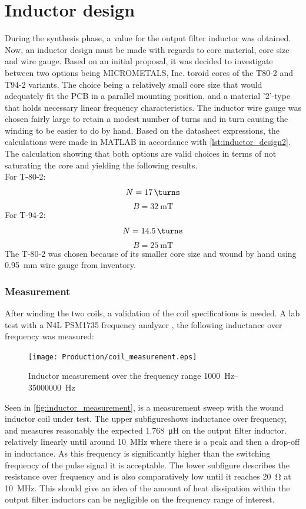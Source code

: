 \section{Inductor design}
During the synthesis phase, a value for the output filter inductor was obtained. Now, an inductor design must be made with regards to core material, core size and wire gauge. Based on an initial proposal, it was decided to investigate between two options being MICROMETALS, Inc. toroid cores of the T80-2 and T94-2 variants. The choice being a relatively small core size that would adequately fit the PCB in a parallel mounting position, and a material '2'-type that holds necessary linear frequency characteristics. The inductor wire gauge was chosen fairly large to retain a modest number of turns and in turn causing the winding to be easier to do by hand.
Based on the datasheet \cite{micrometals} expressions, the calculations were made in MATLAB in accordance with \autoref{lst:inductor_design2}. The calculation showing that both options are valid choices in terms of not saturating the core and yielding the following results. \\
For T-80-2:
$$N = \SI{17}{\turns}$$
$$B = \SI{32}{\milli\tesla}$$
For T-94-2:
$$N = \SI{14.5}{\turns}$$
$$B = \SI{25}{\milli\tesla}$$
The T-80-2 was chosen because of its smaller core size and wound by hand using \SI{0.95}{\milli\meter} wire gauge from inventory. \\
\subsubsection{Measurement}
After winding the two coils, a validation of the coil specifications is needed. A lab test with a N4L PSM1735 frequency analyzer \cite{n4l_analyzer}, the following inductance over frequency was measured:
\begin{figure}[htbp]
	\centering
	\texttt{[image: Production/coil\_measurement.eps]}
	\caption{Inductor measurement over the frequency range \SIrange[scientific-notation = engineering]{1000}{35000000}{\hertz}}
	\label{fig:inductor_measurement}
\end{figure}
Seen in \autoref{fig:inductor_measurement}, is a measurement sweep with the wound inductor coil under test. The upper subfigureshows inductance over frequency, and measures reasonably the expected \SI{1.768}{\micro\henry} on the output filter inductor. relatively linearly until around \SI{10}{\mega\hertz} where there is a peak and then a drop-off in inductance. As this frequency is significantly higher than the switching frequency of the pulse signal it is acceptable. The lower subfigure describes the resistance over frequency and is also comparatively low until it reaches \SI{20}{\ohm} at \SI{10}{\mega\hertz}. This should give an idea of the amount of heat dissipation within the output filter inductors can be negligible on the frequency range of interest.

